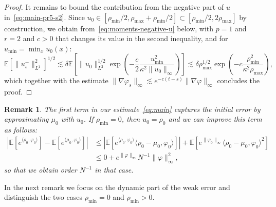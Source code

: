 \documentclass[a4paper,12pt]{article}
\newtheorem{remark}[theorem]{Remark}
\newcommand{\E}{\mathbb{E}}
\begin{document}
\begin{proof}
  It remains to bound the contribution from the negative part of $u$ in~\eqref{eq:main-pr5-s2}. Since $u_0 \in [\rho_{\min}/2,\rho_{\max} + \rho_{\min}/2] \subset [\rho_{\min}/2, 2\rho_{\max}]$  
  by construction, we obtain from~\eqref{eq:moments-negative-u} below, with $p=1$ and $r=2$ and $c>0$ that changes its value in the second inequality, and for $u_{\min} = \min_x u_0(x)$:
  \[
    \E[\|u_s^-\|_{L^1}^2]^{1/2} \lesssim \delta \E\left[\|u_0\|_{L^2}^{1/2}  \exp \left( -\frac{c}{2} \frac{u_{\min}^2}{\kappa^2 \|u_0\|_\infty}\right)\right] \lesssim \delta \rho_{\max}^{1/2}\exp \left( -c \frac{\rho_{\min}^2}{\kappa^2 \rho_{\max}}\right),
  \]
  which together with the estimate $\|\nabla \varphi_s\|_\infty \lesssim e^{-c(t-s)}\|\nabla \varphi\|_\infty$ concludes the proof.
\end{proof}

\begin{remark}\label{rmk:zero-IC}
  The first term in our estimate~\eqref{eq:main} captures the initial error by approximating $\mu_0$ with $u_0$. If $\rho_{\min}=0$, then $u_0 = \rho_0$ and we can improve this term as follows:
  \begin{align*}
    |\mathbb E[e^{\langle \rho_0,\varphi_0\rangle}] - \mathbb E[e^{\langle \mu_0,\varphi_0\rangle}]| & \leq |\mathbb E[e^{\langle \rho_0,\varphi_0\rangle}\langle \rho_0 - \mu_0, \varphi_0\rangle]| + \mathbb E[e^{\|\varphi_0\|_\infty}\langle \rho_0 - \mu_0, \varphi_0\rangle^2]\\
    & \leq 0 + e^{\|\varphi\|_\infty} N^{-1} \|\varphi\|_\infty^2,
  \end{align*}
 so that we obtain order $N^{-1}$ in that case.
\end{remark}

In the next remark we focus on the dynamic part of the weak error and distinguish the two cases $\rho_{\min} = 0$  and $\rho_{\min}>0$.
\end{document}
